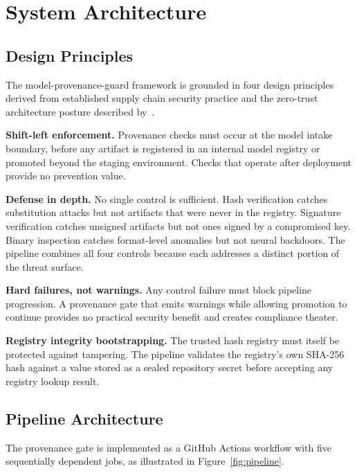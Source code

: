 \documentclass[sigconf,review]{acmart}
\begin{document}
\section{System Architecture}
\label{sec:design}

\subsection{Design Principles}

The model-provenance-guard framework is grounded in four design principles
derived from established supply chain security practice and the zero-trust
architecture posture described by~\citet{mudusu2026zerotrust}.

\textbf{Shift-left enforcement.} Provenance checks must occur at the model
intake boundary, before any artifact is registered in an internal model
registry or promoted beyond the staging environment. Checks that operate
after deployment provide no prevention value.

\textbf{Defense in depth.} No single control is sufficient. Hash
verification catches substitution attacks but not artifacts that were never
in the registry. Signature verification catches unsigned artifacts but not
ones signed by a compromised key. Binary inspection catches format-level
anomalies but not neural backdoors. The pipeline combines all four controls
because each addresses a distinct portion of the threat surface.

\textbf{Hard failures, not warnings.} Any control failure must block pipeline
progression. A provenance gate that emits warnings while allowing promotion
to continue provides no practical security benefit and creates compliance
theater.

\textbf{Registry integrity bootstrapping.} The trusted hash registry must
itself be protected against tampering. The pipeline validates the registry's
own SHA-256 hash against a value stored as a sealed repository secret before
accepting any registry lookup result.

\subsection{Pipeline Architecture}

The provenance gate is implemented as a GitHub Actions workflow with five
sequentially dependent jobs, as illustrated in Figure~\ref{fig:pipeline}.
\end{document}
